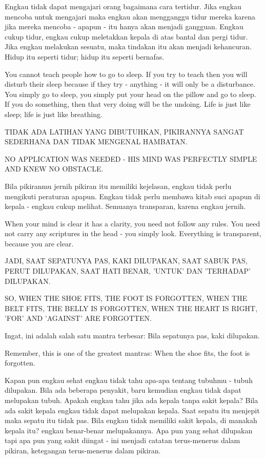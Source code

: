 \bahasa
Engkau tidak dapat mengajari orang bagaimana cara tertidur. Jika engkau mencoba untuk mengajari maka engkau akan mengganggu tidur mereka karena jika mereka mencoba - apapun - itu hanya akan menjadi gangguan. Engkau cukup tidur, engkau cukup meletakkan kepala di atas bantal dan pergi tidur. Jika engkau melakukan sesuatu, maka tindakan itu akan menjadi kehancuran. Hidup itu seperti tidur; hidup itu seperti bernafas.

\english
You cannot teach people how to go to sleep. If you try to teach then you will disturb their sleep because if they try - anything - it will only be a disturbance. You simply go to sleep, you simply put your head on the pillow and go to sleep. If you do something, then that very doing will be the undoing. Life is just like sleep; life is just like breathing.

\bahasa
TIDAK ADA LATIHAN YANG DIBUTUHKAN, PIKIRANNYA SANGAT SEDERHANA DAN TIDAK MENGENAL HAMBATAN.


\english
NO APPLICATION WAS NEEDED - HIS MIND WAS PERFECTLY SIMPLE AND KNEW NO OBSTACLE.

\bahasa
Bila pikiranmu jernih pikiran itu memiliki kejelasan, engkau tidak perlu mengikuti peraturan apapun. Engkau tidak perlu membawa kitab suci apapun di kepala - engkau cukup melihat. Semuanya transparan, karena engkau jernih.

\english
When your mind is clear it has a clarity, you need not follow any rules. You need not carry any scriptures in the head - you simply look. Everything is transparent, because you are clear.

\bahasa
JADI, SAAT SEPATUNYA PAS, KAKI DILUPAKAN, SAAT SABUK PAS, PERUT DILUPAKAN, SAAT HATI BENAR, 'UNTUK' DAN 'TERHADAP' DILUPAKAN.

\english
SO, WHEN THE SHOE FITS, THE FOOT IS FORGOTTEN, WHEN THE BELT FITS, THE BELLY IS FORGOTTEN, WHEN THE HEART IS RIGHT, 'FOR' AND 'AGAINST' ARE FORGOTTEN.

\bahasa
Ingat, ini adalah salah satu mantra terbesar: Bila sepatunya pas, kaki dilupakan.

\english
Remember, this is one of the greatest mantras: When the shoe fits, the foot is forgotten.

\bahasa
Kapan pun engkau sehat engkau tidak tahu apa-apa tentang tubuhmu - tubuh dilupakan. Bila ada beberapa penyakit, baru kemudian engkau tidak dapat melupakan tubuh. Apakah engkau tahu jika ada kepala tanpa sakit kepala? Bila ada sakit kepala engkau tidak dapat melupakan kepala. Saat sepatu itu menjepit maka sepatu itu tidak pas. Bila engkau tidak memiliki sakit kepala, di manakah kepala itu? engkau benar-benar melupakannya. Apa pun yang sehat dilupakan tapi apa pun yang sakit diingat - ini menjadi catatan terus-menerus dalam pikiran, ketegangan terus-menerus dalam pikiran.

